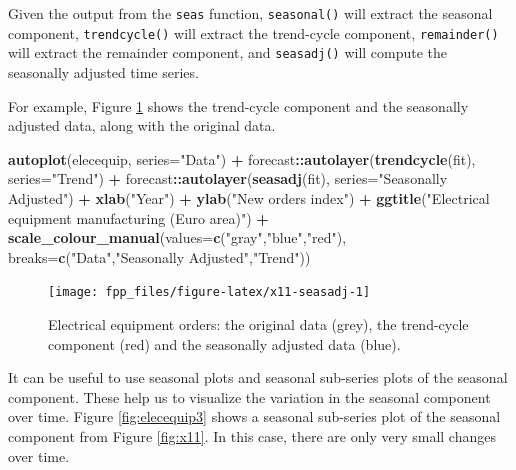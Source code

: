 \documentclass[]{book}
\newenvironment{Shaded}{\begin{snugshade}}{\end{snugshade}}
\newcommand{\DataTypeTok}[1]{\textcolor[rgb]{0.13,0.29,0.53}{#1}}
\newcommand{\KeywordTok}[1]{\textcolor[rgb]{0.13,0.29,0.53}{\textbf{#1}}}
\newcommand{\NormalTok}[1]{#1}
\newcommand{\OperatorTok}[1]{\textcolor[rgb]{0.81,0.36,0.00}{\textbf{#1}}}
\newcommand{\StringTok}[1]{\textcolor[rgb]{0.31,0.60,0.02}{#1}}
\begin{document}
Given the output from the \texttt{seas} function, \texttt{seasonal()} will extract the seasonal component, \texttt{trendcycle()} will extract the trend-cycle component, \texttt{remainder()} will extract the remainder component, and \texttt{seasadj()} will compute the seasonally adjusted time series.

For example, Figure \ref{fig:x11-seasadj} shows the trend-cycle component and the seasonally adjusted data, along with the original data.

\begin{Shaded}
\begin{Highlighting}[]
\KeywordTok{autoplot}\NormalTok{(elecequip, }\DataTypeTok{series=}\StringTok{"Data"}\NormalTok{) }\OperatorTok{+}
\StringTok{  }\NormalTok{forecast}\OperatorTok{::}\KeywordTok{autolayer}\NormalTok{(}\KeywordTok{trendcycle}\NormalTok{(fit), }\DataTypeTok{series=}\StringTok{"Trend"}\NormalTok{) }\OperatorTok{+}
\StringTok{  }\NormalTok{forecast}\OperatorTok{::}\KeywordTok{autolayer}\NormalTok{(}\KeywordTok{seasadj}\NormalTok{(fit), }\DataTypeTok{series=}\StringTok{"Seasonally Adjusted"}\NormalTok{) }\OperatorTok{+}
\StringTok{  }\KeywordTok{xlab}\NormalTok{(}\StringTok{"Year"}\NormalTok{) }\OperatorTok{+}\StringTok{ }\KeywordTok{ylab}\NormalTok{(}\StringTok{"New orders index"}\NormalTok{) }\OperatorTok{+}
\StringTok{  }\KeywordTok{ggtitle}\NormalTok{(}\StringTok{"Electrical equipment manufacturing (Euro area)"}\NormalTok{) }\OperatorTok{+}
\StringTok{  }\KeywordTok{scale_colour_manual}\NormalTok{(}\DataTypeTok{values=}\KeywordTok{c}\NormalTok{(}\StringTok{"gray"}\NormalTok{,}\StringTok{"blue"}\NormalTok{,}\StringTok{"red"}\NormalTok{),}
                     \DataTypeTok{breaks=}\KeywordTok{c}\NormalTok{(}\StringTok{"Data"}\NormalTok{,}\StringTok{"Seasonally Adjusted"}\NormalTok{,}\StringTok{"Trend"}\NormalTok{))}
\end{Highlighting}
\end{Shaded}

\begin{figure}

{\centering \texttt{[image: fpp\_files/figure-latex/x11-seasadj-1]} 

}

\caption{Electrical equipment orders: the original data (grey), the trend-cycle component (red) and the seasonally adjusted data (blue).}\label{fig:x11-seasadj}
\end{figure}

It can be useful to use seasonal plots and seasonal sub-series plots of the seasonal component. These help us to visualize the variation in the seasonal component over time. Figure \ref{fig:elecequip3} shows a seasonal sub-series plot of the seasonal component from Figure \ref{fig:x11}. In this case, there are only very small changes over time.
\end{document}
